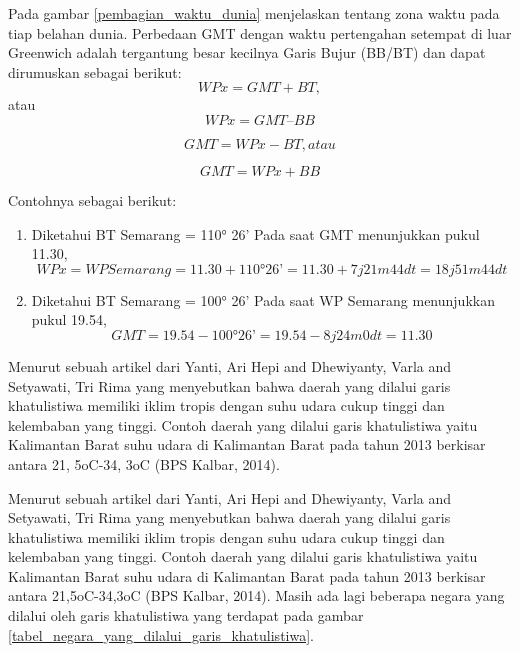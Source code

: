 Pada gambar \ref{pembagian_waktu_dunia} menjelaskan tentang zona waktu pada tiap belahan dunia. Perbedaan GMT dengan waktu pertengahan setempat di luar Greenwich adalah tergantung besar kecilnya Garis Bujur (BB/BT) dan dapat dirumuskan sebagai berikut\cite{khusurur2016mengenal}:
\begin{equation}
WP x = GMT + BT, 
\end{equation}
atau 
\begin{equation}
WP x = GMT – BB
\end{equation}

\begin{equation}
GMT = WP x - BT, 
atau
\end{equation}

\begin{equation}
GMT = WP x + BB
\end{equation}

Contohnya sebagai berikut:

\begin{enumerate}
\item
Diketahui BT Semarang = 110° 26’
Pada saat GMT menunjukkan pukul 11.30, 
\begin{equation}
WP x = WP Semarang = 11.30 + 110° 26’
= 11.30 + 7 j 21m 44dt
= 18 j 51 m 44 dt
\end{equation}

\item
Diketahui BT Semarang = 100° 26’
Pada saat WP Semarang menunjukkan pukul 19.54,
\begin{equation}
GMT = 19.54 - 100° 26’
    = 19.54 - 8 j 24m 0dt
    = 11.30
\end{equation}
\end{enumerate}




	Menurut sebuah artikel dari Yanti, Ari Hepi and Dhewiyanty, Varla and Setyawati, Tri Rima yang menyebutkan bahwa daerah yang dilalui garis khatulistiwa 
memiliki iklim tropis dengan suhu udara cukup tinggi dan kelembaban yang tinggi. Contoh daerah yang dilalui garis khatulistiwa yaitu Kalimantan Barat
suhu udara di Kalimantan Barat pada tahun 2013 berkisar antara 21, 5oC-34, 3oC (BPS Kalbar, 2014). \cite {yanti2015prevalensi}


	Menurut sebuah artikel dari Yanti, Ari Hepi and Dhewiyanty, Varla and Setyawati, Tri Rima yang menyebutkan bahwa daerah yang dilalui garis khatulistiwa 
memiliki iklim tropis dengan suhu udara cukup tinggi dan kelembaban yang tinggi. Contoh daerah yang dilalui garis khatulistiwa yaitu Kalimantan Barat suhu udara di Kalimantan Barat pada tahun 2013 berkisar antara 21,5oC-34,3oC (BPS Kalbar, 2014)\cite{yanti2015prevalensi}. Masih ada lagi beberapa negara yang dilalui oleh garis khatulistiwa yang terdapat pada gambar \ref{tabel_negara_yang_dilalui_garis_khatulistiwa}.

